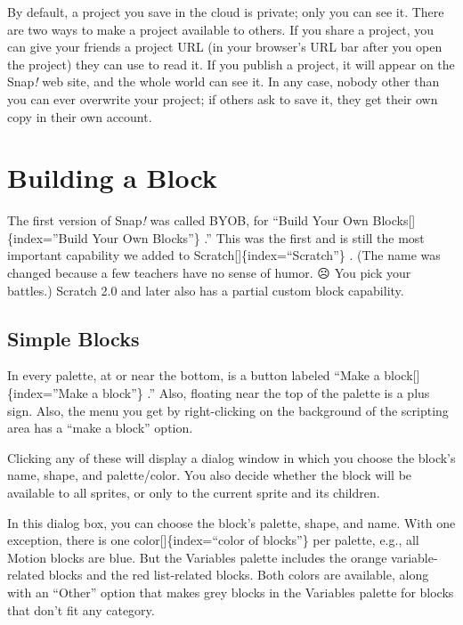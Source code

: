 \documentclass[
  letterpaper,
]{book}
\begin{document}
By default, a project you save in the cloud is private; only you can see
it. There are two ways to make a project available to others. If you
share a project, you can give your friends a project URL (in your
browser's URL bar after you open the project) they can use to read it.
If you publish a project, it will appear on the Snap\emph{!} web site,
and the whole world can see it. In any case, nobody other than you can
ever overwrite your project; if others ask to save it, they get their
own copy in their own account.


\chapter{Building a Block}\label{building-a-block}

The first version of Snap\emph{!} was called BYOB, for ``Build Your Own
Blocks{[}{]}\{index=''Build Your Own Blocks''\} .'' This was the first
and is still the most important capability we added to
Scratch{[}{]}\{index=``Scratch''\} . (The name was changed because a few
teachers have no sense of humor. ☹ You pick your battles.) Scratch 2.0
and later also has a partial custom block capability.

\section{Simple Blocks}\label{simple-blocks}

In every palette, at or near the bottom, is a button labeled ``Make a
block{[}{]}\{index=''Make a block''\} .'' Also, floating near the top of
the palette is a plus sign. Also, the menu you get by right-clicking on
the background of the scripting area has a ``make a block'' option.

Clicking any of these will display a dialog window in which you choose
the block's name, shape, and palette/color. You also decide whether the
block will be available to all sprites, or only to the current sprite
and its children.

In this dialog box, you can choose the block's palette, shape, and name.
With one exception, there is one color{[}{]}\{index=``color of
blocks''\} per palette, e.g., all Motion blocks are blue. But the
Variables palette includes the orange variable-related blocks and the
red list-related blocks. Both colors are available, along with an
``Other'' option that makes grey blocks in the Variables palette for
blocks that don't fit any category.
\end{document}
